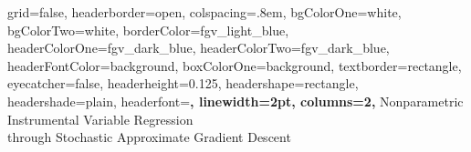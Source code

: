 \documentclass[
    a0paper,
    portrait,
    margin=3cm,
]{baposter}
\theoremstyle{fancy} %
\theoremstyle{regular}
\begin{document}
\newcommand{\highlight}[1]{{\color{fgv_light_blue}\textbf{#1}}}

\begin{poster}
{
    grid=false,
    headerborder=open, %
    colspacing=.8em, %
    bgColorOne=white, %
    bgColorTwo=white, %
    borderColor=fgv_light_blue, %
    headerColorOne=fgv_dark_blue, %
    headerColorTwo=fgv_dark_blue, %
    headerFontColor=background, %
    boxColorOne=background, %
    textborder=rectangle, %
    eyecatcher=false, %
    headerheight=0.125\textheight, %
    headershape=rectangle, %
    headershade=plain,
    headerfont=\Large\bf\sffamily\centering, %
    linewidth=2pt, %
    columns=2,
}
{}
%
%
{
{
    \vspace{1.3em}
    {\huge \sffamily Nonparametric Instrumental Variable Regression \\ through Stochastic Approximate  Gradient Descent}
    \vspace{.1em}
}
}
{
}
\end{poster}
\end{document}
